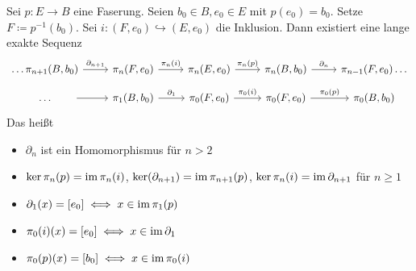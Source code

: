 \begin{satz}[{name=[lange Homotopiesequenz]}]
	Sei $p \colon E \to B$ eine Faserung. 
	Seien $b_0 \in B, e_0 \in E$ mit $p(e_0)= b_0$. 
	Setze $F \coloneqq p ^{-1}(b_0)$. 
	Sei $i \colon (F, e_0) \hookrightarrow (E,e_0)$ die Inklusion.
	Dann existiert eine lange exakte Sequenz
	\[
		\begin{tikzcd}[row sep=1em]
			\ldots  \pi_{n+1}(B,b_0) \rar["\partial_{n+1}"] & \pi_n(F,e_0) \rar["\pi_n(i)"] & \pi_n(E,e_0) \rar["\pi_n(p)"]& \pi_n(B,b_0)  \rar["\partial_n"]& \pi_{n-1}(F,e_0) \ldots  \\
			\qquad \ldots  \qquad  \rar & \pi_1(B,b_0) \rar["\partial_1"] & \pi_0(F,e_0) \rar["\pi_0(i)"]& \pi_0(F,e_0) \rar["\pi_0(p)"]& \pi_0(B,b_0)
		\end{tikzcd}
	\]
	Das heißt
	\begin{itemize}
		\item $\partial_n$ ist ein Homomorphismus für $n >2$
		\item $\ker \pi_n(p) = \operatorname{im} \pi_n(i)$, $\ker( \partial_{n+1}) = \operatorname{im} \pi_{n+1}(p)$, $\ker \pi_n(i) = \operatorname{im} \partial_{n+1}$ für $n \ge 1$
		\item $\partial_1(x) = [e_0] \iff x \in \operatorname{im} \pi_1(p)$
		\item $\pi_0(i)(x) = [e_0] \iff x \in \operatorname{im} \partial_1$
		\item $\pi_0(p)(x) = [b_0] \iff x \in \operatorname{im} \pi_0 (i)$
	\end{itemize}
\end{satz}
